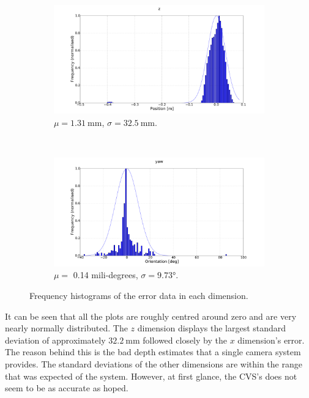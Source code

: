 \begin{figure}
  \begin{subfigure}{0.48\textwidth}
     \includegraphics[clip, trim = 120 0 120 0, width=\textwidth]{figures/chapter3/norm_z.pdf}
     \caption{$\mu = \SI{1.31}{\mm}$, $\sigma = \SI{32.5}{\mm}$.}
  \label{fig:norm-z}
  \end{subfigure}
~
\begin{subfigure}{0.48\textwidth}
     \includegraphics[clip, trim = 120 0 120 0, width=\textwidth]{figures/chapter3/norm_yaw.pdf}
     \caption{$\mu = $ 0.14 mili-degrees, $\sigma = \ang{9.73}$. }
  \label{fig:norm-yaw}
  \end{subfigure}
  \caption[Frequency histograms of the error data in each dimension.]{Frequency histograms of the error data in each dimension.}
  \label{fig:err-norm}
\end{figure}

It can be seen that all the plots are roughly centred around zero and are very nearly normally distributed. The $z$ dimension displays the largest standard deviation of approximately $\SI{32.2}{\mm}$ followed closely by the $x$ dimension's error. The reason behind this is the bad depth estimates that a single camera system provides. The standard deviations of the other dimensions are within the range that was expected of the system. However, at first glance, the CVS's does not seem to be as accurate as hoped. 

